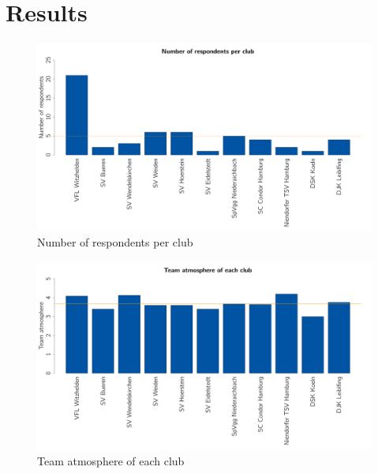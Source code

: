 \documentclass[	
	12pt, %
	a4paper, %
]{scrartcl}\usepackage[]{graphicx}\usepackage[]{color}
\newenvironment{knitrout}{}{} %
\begin{document}
\section{Results}
\label{sec:results}

\begin{knitrout}\footnotesize
{}\color{fgcolor}\begin{figure}[]


{\centering \includegraphics[width=1\linewidth]{figure/beamer-clubname} 

}

\caption[Number of respondents per club]{Number of respondents per club\label{fig:clubname}}
\end{figure}


\end{knitrout}



\begin{knitrout}\footnotesize
{}\color{fgcolor}\begin{figure}[]


{\centering \includegraphics[width=1\linewidth]{figure/beamer-atmosphere} 

}

\caption[Team atmosphere of each club]{Team atmosphere of each club\label{fig:atmosphere}}
\end{figure}


\end{knitrout}
\end{document}
